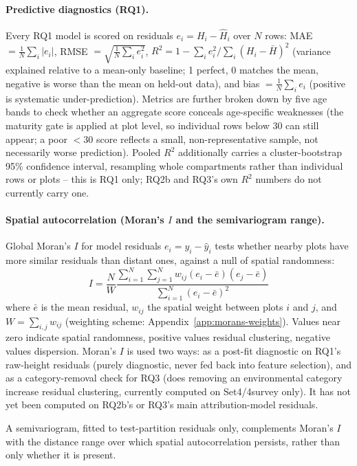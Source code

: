 \documentclass[11pt,a4paper]{report}
\begin{document}
\paragraph*{Predictive diagnostics (RQ1).}
Every RQ1 model is scored on residuals $e_i = H_i - \hat H_i$ over $N$ rows: MAE $=\frac{1}{N}\sum_i|e_i|$, RMSE $=\sqrt{\frac{1}{N}\sum_i e_i^2}$, $R^2 = 1-\sum_i e_i^2/\sum_i(H_i-\bar H)^2$ (variance explained relative to a mean-only baseline; 1 perfect, 0 matches the mean, negative is worse than the mean on held-out data), and bias $=\frac{1}{N}\sum_i e_i$ (positive is systematic under-prediction). Metrics are further broken down by five age bands to check whether an aggregate score conceals age-specific weaknesses (the maturity gate is applied at plot level, so individual rows below 30 can still appear; a poor $<30$ score reflects a small, non-representative sample, not necessarily worse prediction). Pooled $R^2$ additionally carries a cluster-bootstrap 95\% confidence interval, resampling whole compartments rather than individual rows or plots -- this is RQ1 only; RQ2b and RQ3's own $R^2$ numbers do not currently carry one.

\paragraph*{Spatial autocorrelation (Moran's $I$ and the semivariogram range).}
Global Moran's $I$ for model residuals $e_i = y_i - \hat y_i$ tests whether nearby plots have more similar residuals than distant ones, against a null of spatial randomness:
\begin{equation}
    I = \frac{N}{W} \frac{\sum_{i=1}^{N} \sum_{j=1}^{N} w_{ij} (e_i - \bar{e})(e_j - \bar{e})}{\sum_{i=1}^{N} (e_i - \bar{e})^2}
    \label{eq:morans_i}
\end{equation}
where $\bar e$ is the mean residual, $w_{ij}$ the spatial weight between plots $i$ and $j$, and $W=\sum_{i,j} w_{ij}$ (weighting scheme: Appendix~\ref{app:morans-weights}). Values near zero indicate spatial randomness, positive values residual clustering, negative values dispersion. Moran's $I$ is used two ways: as a post-fit diagnostic on RQ1's raw-height residuals (purely diagnostic, never fed back into feature selection), and as a category-removal check for RQ3 (does removing an environmental category increase residual clustering, currently computed on Set4/4survey only). It has not yet been computed on RQ2b's or RQ3's main attribution-model residuals.

A semivariogram, fitted to test-partition residuals only, complements Moran's $I$ with the distance range over which spatial autocorrelation persists, rather than only whether it is present.
\end{document}
